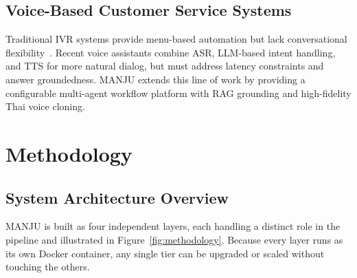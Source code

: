 \documentclass[10pt, a4paper, twocolumn]{article}
\begin{document}
\subsection{Voice-Based Customer Service Systems}
Traditional IVR systems provide menu-based automation but lack conversational flexibility~\cite{gans2003callcenters}.
Recent voice assistants combine ASR, LLM-based intent handling, and TTS for more natural dialog, but must address latency constraints and answer groundedness.
MANJU extends this line of work by providing a configurable multi-agent workflow platform with RAG grounding and high-fidelity Thai voice cloning.

\section{Methodology}
\label{sec:methodology}

\subsection{System Architecture Overview}

MANJU is built as four independent layers, each handling a distinct role
in the pipeline and illustrated in Figure~\ref{fig:methodology}.
Because every layer runs as its own Docker container, any single tier can
be upgraded or scaled without touching the others.
\end{document}
